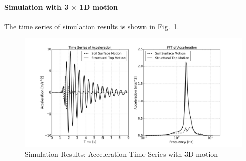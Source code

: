 \paragraph{Simulation with 3 $\times$ 1D motion }
The time series of simulation results is shown in Fig.~\ref{fig_decon_3D_motion_1D_model_results_top_bottom_time_series_ssi3d_3D_motion}.
\begin{figure}[H]
  \centering
  \includegraphics[width = 15cm]{./Figure-files/nonlinear_analysis_steps/soil-structure-3D-ans/shell_structure_motion_node_38_x_acce_compare.pdf}
  \caption{Simulation Results: Acceleration Time Series with 3D motion}
  \label{fig_decon_3D_motion_1D_model_results_top_bottom_time_series_ssi3d_3D_motion}
\end{figure}

